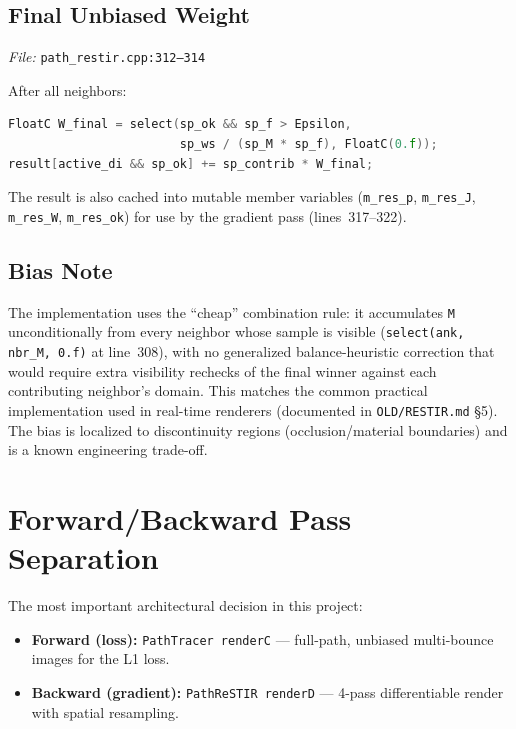 \subsection{Final Unbiased Weight}
\label{sec:finalweight}

\emph{File:} \texttt{path\_restir.cpp:312--314}

After all neighbors:
\begin{lstlisting}[language=C++,basicstyle=\footnotesize\ttfamily]
FloatC W_final = select(sp_ok && sp_f > Epsilon,
                        sp_ws / (sp_M * sp_f), FloatC(0.f));
result[active_di && sp_ok] += sp_contrib * W_final;
\end{lstlisting}

The result is also cached into mutable member variables (\texttt{m\_res\_p},
\texttt{m\_res\_J}, \texttt{m\_res\_W}, \texttt{m\_res\_ok}) for use by the
gradient pass (lines~317--322).

\subsection{Bias Note}

The implementation uses the ``cheap'' combination rule: it accumulates
\texttt{M} unconditionally from every neighbor whose sample is visible
(\texttt{select(ank, nbr\_M, 0.f)} at line~308), with no generalized
balance-heuristic correction that would require extra visibility rechecks of
the final winner against each contributing neighbor's domain. This matches
the common practical implementation used in real-time renderers (documented
in \texttt{OLD/RESTIR.md} \S5). The bias is localized to
discontinuity regions (occlusion/material boundaries) and is a known
engineering trade-off.

\section{Forward/Backward Pass Separation}
\label{sec:fwdbwd}

The most important architectural decision in this project:

\begin{itemize}
    \item \textbf{Forward (loss):} \texttt{PathTracer renderC} --- full-path,
        unbiased multi-bounce images for the L1 loss.
    \item \textbf{Backward (gradient):} \texttt{PathReSTIR renderD} --- 4-pass
        differentiable render with spatial resampling.
\end{itemize}

